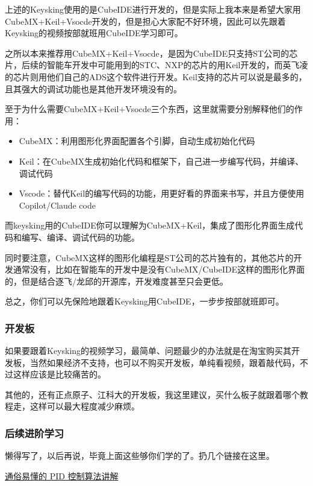 \documentclass[a4paper,12pt]{article}
\begin{document}
上述的Keysking使用的是CubeIDE进行开发的，但是实际上我本来是希望大家用CubeMX+Keil+Vsocde开发的，但是担心大家配不好环境，因此可以先跟着Keysking的视频按部就班用CubeIDE学习即可。

之所以本来推荐用CubeMX+Keil+Vsocde，是因为CubeIDE只支持ST公司的芯片，后续的智能车开发中可能用到的STC、NXP的芯片的用Keil开发的，而英飞凌的芯片则用他们自己的ADS这个软件进行开发。Keil支持的芯片可以说是最多的，且其强大的调试功能也是其他开发环境没有的。

至于为什么需要CubeMX+Keil+Vsocde三个东西，这里就需要分别解释他们的作用：

\begin{itemize}
    \item CubeMX：利用图形化界面配置各个引脚，自动生成初始化代码
    \item Keil：在CubeMX生成初始化代码和框架下，自己进一步编写代码，并编译、调试代码
    \item Vscode：替代Keil的编写代码的功能，用更好看的界面来书写，并且方便使用Copilot/Claude code
\end{itemize}

而keysking用的CubeIDE你可以理解为CubeMX+Keil，集成了图形化界面生成代码和编写、编译、调试代码的功能。

同时要注意，CubeMX这样的图形化编程是ST公司的芯片独有的，其他芯片的开发通常没有，比如在智能车的开发中是没有CubeMX/CubeIDE这样的图形化界面的，但是结合逐飞/龙邱的开源库，开发难度甚至只会更低。

总之，你们可以先保险地跟着Keysking用CubeIDE，一步步按部就班即可。

\subsubsection{开发板}

如果要跟着Keysking的视频学习，最简单、问题最少的办法就是在淘宝购买其开发板，当然如果经济不支持，也可以不购买开发板，单纯看视频，跟着敲代码，不过这样应该是比较痛苦的。

其他的，还有正点原子、江科大的开发板，我这里建议，买什么板子就跟着哪个教程走，这样可以最大程度减少麻烦。

\subsubsection{后续进阶学习}

懒得写了，以后再说，毕竟上面这些够你们学的了。扔几个链接在这里。

\href{https://www.bilibili.com/video/BV1et4y1i7Gm/}{通俗易懂的 PID 控制算法讲解}
\end{document}
